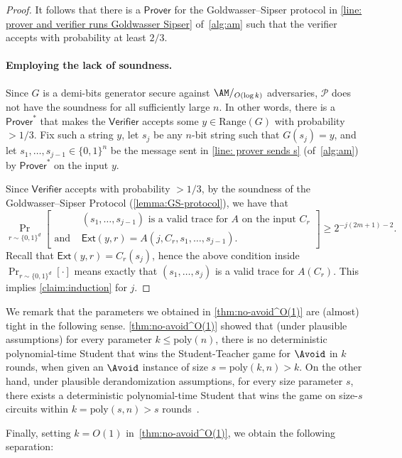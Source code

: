 \documentclass[10pt,a4paper]{article}
\theoremstyle{definition}
\theoremstyle{remark}
\renewcommand{\poly}{\mathrm{poly}}
\newcommand{\Ext}{\mathsf{Ext}}
\newcommand{\Range}{\mathrm{Range}}
\newcommand{\Prover}{\mathsf{Prover}}
\newcommand{\Verifier}{\mathsf{Verifier}}
\begin{document}
\begin{proof}
It follows that there is a $\Prover$ for the Goldwasser--Sipser protocol in \autoref{line: prover and verifier runs Goldwasser Sipser} of~\autoref{alg:am} such that the verifier accepts with probability at least $2/3$.

\paragraph{Employing the lack of soundness.} Since $G$ is a demi-bits generator secure against $\AM/_{O(\log k)}$ adversaries, $\mathcal{P}$ does not have the soundness for all sufficiently large $n$. In other words, there is a $\Prover^*$ that makes the $\Verifier$ accepts some $y\in\Range(G)$ with probability $>1/3$. Fix such a string $y$, let $s_j$ be any $n$-bit string such that $G(s_j) = y$, and let $s_1, \dots, s_{j-1} \in \{0,1\}^n$ be the message sent in \autoref{line: prover sends s} (of~\autoref{alg:am}) by $\Prover^*$ on the input $y$.

Since $\Verifier$ accepts with probability $>1/3$, by the soundness of the Goldwasser--Sipser Protocol (\autoref{lemma:GS-protocol}), we have that
\[\Pr_{r\sim \{0,1\}^d}\left[\begin{aligned}
                &(s_1, \dots, s_{j-1})\text{ is a valid trace for $A$ on the input $C_r$}\\
                \text{and }&\Ext(y, r) = A(j, C_r, s_1, \dots, s_{j-1}).
            \end{aligned}\right] \ge 2^{-j(2m+1)-2}.\]
Recall that $\Ext(y, r) = C_r(s_j)$, hence the above condition inside $\Pr_{r\sim \{0,1\}^d}[\cdot]$ means exactly that $(s_1, \dots, s_j)$ is a valid trace for $A(C_r)$. This implies \autoref{claim:induction} for $j$.
\end{proof}


We remark that the parameters we obtained in \autoref{thm:no-avoid^O(1)} are (almost) tight in the following sense. \autoref{thm:no-avoid^O(1)} showed that (under plausible assumptions) for every parameter $k\le \poly(n)$, there is no deterministic polynomial-time Student that wins the Student-Teacher game for $\Avoid$ in $k$ rounds, when given an $\Avoid$ instance of size $s = \poly(k, n) > k$. On the other hand, under plausible derandomization assumptions, for every size parameter $s$, there exists a deterministic polynomial-time Student that wins the game on size-$s$ circuits within $k = \poly(s, n) > s$ rounds~\cite[Appendix A]{DBLP:conf/stoc/IlangoLW23}. 

Finally, setting $k=O(1)$ in~\autoref{thm:no-avoid^O(1)}, we obtain the following separation:
\end{document}
